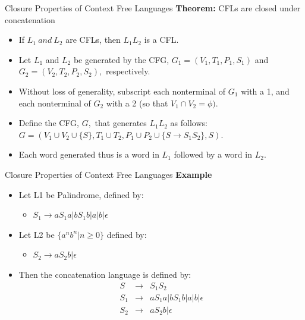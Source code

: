 \documentclass{beamer}
\begin{document}
\begin{frame}{Closure Properties of Context Free Languages}
	\textbf{Theorem:} CFLs are closed under concatenation
	\begin{itemize}
		\item If $L_1 \ and \ L_2$ are CFLs, then $L_1L_2$ is a CFL.
	\end{itemize}
\proofname
\begin{itemize}
	\item Let $L_1$ and $L_2$ be generated by the CFG, $G_1 = (V_1, T_1, P_1, S_1)$ and
	$G_2 = (V_2, T_2, P_2, S_2),$ respectively.
	\item Without loss of generality, subscript each nonterminal of $G_1$ with a 1,
	and each nonterminal of $G_2$ with a 2 (so that $V_1 \cap V_2 = \phi).$
	\item Define the CFG, $G,$ that generates $L_1L_2$ as follows:
	$G = (V_1 \cup V_2 \cup \{S\}, T_1 \cup T_2, P_1 \cup P_2 \cup \{S \rightarrow S_1S_2\}, S).$
	\item Each word generated thus is a word in $L_1$ followed by a word in $L_2$.

\end{itemize}
\end{frame}
\begin{frame}{Closure Properties of Context Free Languages}
	\textbf{Example} 
	\begin{itemize}
		\item Let L1 be Palindrome, defined by:
		\begin{itemize}
			\item 	$S_1 \rightarrow aS_1a | bS_1b | a | b | \epsilon$
		\end{itemize}
		\item Let L2 be $\{a^nb^n	|n \geq 0\}$ defined by:
		\begin{itemize}
			\item $S_2 \rightarrow aS_2b | \epsilon$
		\end{itemize}
		\item Then the concatenation language is defined by:
	\begin{eqnarray*}
			S &\rightarrow& S_1S_2 \\
		S_1 &\rightarrow& aS_1a | bS_1b | a | b | \epsilon \\
		S_2 &\rightarrow& aS_2b | \epsilon \\
	\end{eqnarray*}
	\end{itemize}
\end{frame}
\end{document}
